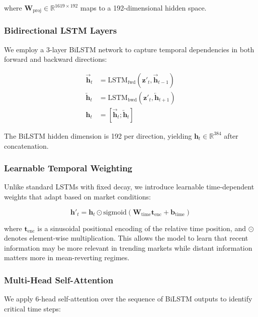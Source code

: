 \documentclass[conference]{IEEEtran}
\begin{document}
where $\mathbf{W}_{\text{proj}} \in \mathbb{R}^{1619 \times 192}$ maps to a 192-dimensional hidden space.

\subsubsection{Bidirectional LSTM Layers}
We employ a 3-layer BiLSTM network to capture temporal dependencies in both forward and backward directions:

\begin{equation}
\begin{aligned}
\overrightarrow{\mathbf{h}}_t &= \text{LSTM}_{\text{fwd}}(\mathbf{z}'_t, \overrightarrow{\mathbf{h}}_{t-1}) \\
\overleftarrow{\mathbf{h}}_t &= \text{LSTM}_{\text{bwd}}(\mathbf{z}'_t, \overleftarrow{\mathbf{h}}_{t+1}) \\
\mathbf{h}_t &= [\overrightarrow{\mathbf{h}}_t; \overleftarrow{\mathbf{h}}_t]
\end{aligned}
\end{equation}

The BiLSTM hidden dimension is 192 per direction, yielding $\mathbf{h}_t \in \mathbb{R}^{384}$ after concatenation.

\subsubsection{Learnable Temporal Weighting}
Unlike standard LSTMs with fixed decay, we introduce learnable time-dependent weights that adapt based on market conditions:

\begin{equation}
\mathbf{h}'_t = \mathbf{h}_t \odot \text{sigmoid}(\mathbf{W}_{\text{time}} \mathbf{t}_{\text{enc}} + \mathbf{b}_{\text{time}})
\end{equation}

where $\mathbf{t}_{\text{enc}}$ is a sinusoidal positional encoding of the relative time position, and $\odot$ denotes element-wise multiplication. This allows the model to learn that recent information may be more relevant in trending markets while distant information matters more in mean-reverting regimes.

\subsubsection{Multi-Head Self-Attention}
We apply 6-head self-attention over the sequence of BiLSTM outputs to identify critical time steps:
\end{document}
